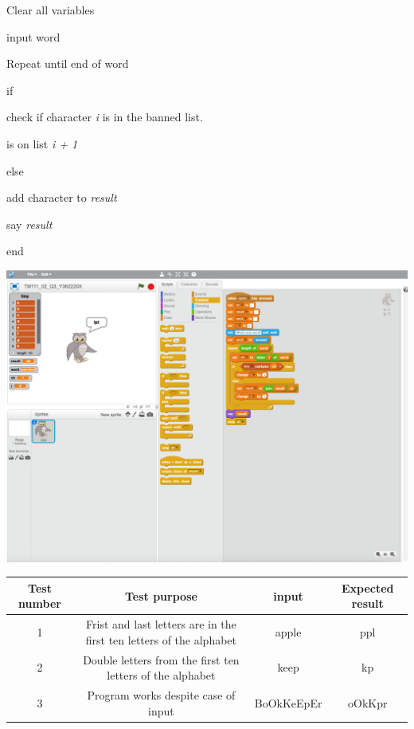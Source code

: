 \documentclass{article}
\begin{document}
\begin{question}

\qpart

\begin{flushleft}
Clear all variables\par
\quad input word\par
Repeat until end of word\par
if\par
\quad check if character \textit{i} is in the banned list.\par
\quad is on list \textit{i + 1}\par
else\par
\quad add character to \textit{result}\par
say \textit{result}\par
end
\end{flushleft}

\qpart

\includegraphics[scale=0.25]{question_3_b.png} 

\qpart

\begin{tabular}{|c|c|c|c|}
    \hline
    Test number & Test purpose & input & Expected result\\
\hline
1 & Frist and last letters are in the first ten letters of the alphabet & apple & ppl\\
\hline
2 & Double letters from the first ten letters of the alphabet & keep & kp\\
\hline
3 & Program works despite case of input & BoOkKeEpEr & oOkKpr\\
\hline
\end{tabular}

\end{question}
\end{document}
